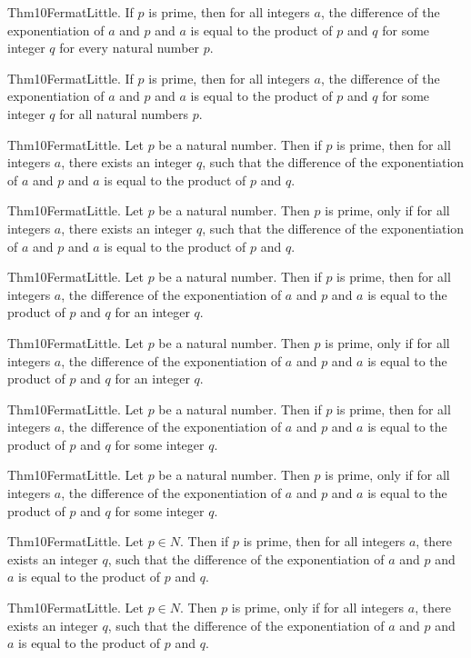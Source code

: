 \documentclass{article}
\begin{document}
Thm10FermatLittle. If $p$ is prime, then for all integers $a$, the difference of the exponentiation of $a$ and $p$ and $a$ is equal to the product of $p$ and $q$ for some integer $q$ for every natural number $p$.

Thm10FermatLittle. If $p$ is prime, then for all integers $a$, the difference of the exponentiation of $a$ and $p$ and $a$ is equal to the product of $p$ and $q$ for some integer $q$ for all natural numbers $p$.

Thm10FermatLittle. Let $p$ be a natural number. Then if $p$ is prime, then for all integers $a$, there exists an integer $q$, such that the difference of the exponentiation of $a$ and $p$ and $a$ is equal to the product of $p$ and $q$.

Thm10FermatLittle. Let $p$ be a natural number. Then $p$ is prime, only if for all integers $a$, there exists an integer $q$, such that the difference of the exponentiation of $a$ and $p$ and $a$ is equal to the product of $p$ and $q$.

Thm10FermatLittle. Let $p$ be a natural number. Then if $p$ is prime, then for all integers $a$, the difference of the exponentiation of $a$ and $p$ and $a$ is equal to the product of $p$ and $q$ for an integer $q$.

Thm10FermatLittle. Let $p$ be a natural number. Then $p$ is prime, only if for all integers $a$, the difference of the exponentiation of $a$ and $p$ and $a$ is equal to the product of $p$ and $q$ for an integer $q$.

Thm10FermatLittle. Let $p$ be a natural number. Then if $p$ is prime, then for all integers $a$, the difference of the exponentiation of $a$ and $p$ and $a$ is equal to the product of $p$ and $q$ for some integer $q$.

Thm10FermatLittle. Let $p$ be a natural number. Then $p$ is prime, only if for all integers $a$, the difference of the exponentiation of $a$ and $p$ and $a$ is equal to the product of $p$ and $q$ for some integer $q$.

Thm10FermatLittle. Let $p \in N$. Then if $p$ is prime, then for all integers $a$, there exists an integer $q$, such that the difference of the exponentiation of $a$ and $p$ and $a$ is equal to the product of $p$ and $q$.

Thm10FermatLittle. Let $p \in N$. Then $p$ is prime, only if for all integers $a$, there exists an integer $q$, such that the difference of the exponentiation of $a$ and $p$ and $a$ is equal to the product of $p$ and $q$.
\end{document}
